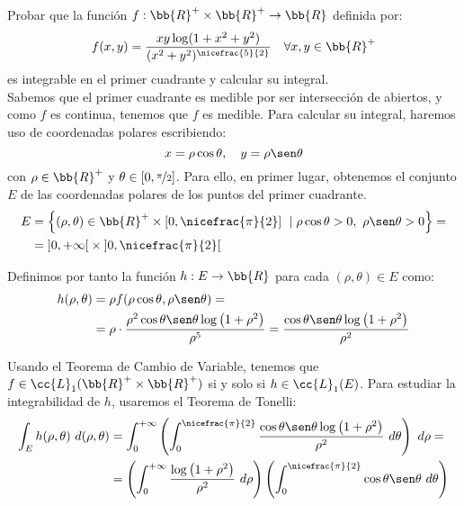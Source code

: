 \begin{ejercicio}
    Probar que la función $f:\bb{R}^+\times \bb{R}^+\to \bb{R}$ definida por:
    \begin{equation*}
        f(x,y) = \dfrac{xy\log(1+x^2+y^2)}{(x^2+y^2)^{\nicefrac{5}{2}}} \quad \forall x,y\in \bb{R}^+
    \end{equation*}
    es integrable en el primer cuadrante y calcular su integral.\\

    Sabemos que el primer cuadrante es medible por ser intersección de abiertos, y como $f$ es continua, tenemos que $f$ es medible.
    Para calcular su integral, haremos uso de coordenadas polares escribiendo:
    \begin{equation*}
        x = \rho\cos\theta, \quad y = \rho\sen\theta
    \end{equation*}
    con $\rho\in \bb{R}^+$ y $\theta\in \left[0, \nicefrac{\pi}{2}\right]$. Para ello, en primer lugar, obtenemos el conjunto $E$ de las coordenadas polares de los puntos del primer cuadrante.
    \begin{align*}
        E &= \left\{ (\rho, \theta) \in \bb{R}^+\times \left[0, \nicefrac{\pi}{2}\right] ~\mid \rho\cos\theta > 0,~\rho\sen\theta > 0 \right\} =\\
        &= \left]0, +\infty\right[\times \left]0, \nicefrac{\pi}{2}\right[
    \end{align*}

    Definimos por tanto la función $h: E \to \bb{R}$ para cada $(\rho, \theta) \in E$ como:
    \begin{align*}
        h(\rho, \theta) &= \rho f(\rho\cos\theta, \rho\sen\theta)=\\
        &= \rho\cdot \dfrac{\rho^2\cos\theta\sen\theta\log\left(1+\rho^2\right)}{\rho^5}
        = \dfrac{\cos\theta\sen\theta\log\left(1+\rho^2\right)}{\rho^2}
    \end{align*}

    Usando el Teorema de Cambio de Variable, tenemos que $f\in \cc{L}_1(\bb{R}^+\times \bb{R}^+)$ si y solo si $h\in \cc{L}_1(E)$. Para estudiar la integrabilidad de $h$, usaremos el Teorema de Tonelli:
    \begin{align*}
        \int_E h(\rho, \theta)~d(\rho, \theta) &=
        \int_0^{+\infty} \left( \int_0^{\nicefrac{\pi}{2}} \dfrac{\cos\theta\sen\theta\log\left(1+\rho^2\right)}{\rho^2}~d\theta \right)~d\rho =\\
        &= \left( \int_0^{+\infty} \dfrac{\log\left(1+\rho^2\right)}{\rho^2}~d\rho \right) \left( \int_0^{\nicefrac{\pi}{2}} \cos\theta\sen\theta~d\theta \right)
    \end{align*}


\end{ejercicio}
